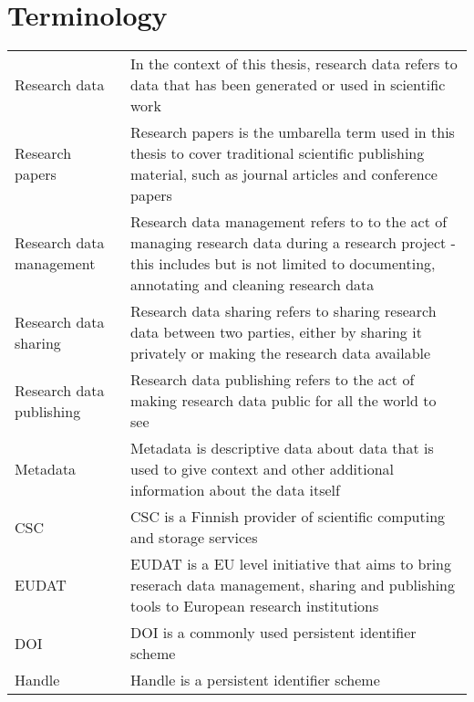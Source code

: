 \chapter*{Terminology}
{}



\noindent
\begin{longtable}{@{}p{}p{}@{}}
Research data & In the context of this thesis, research data refers to data that
has been generated or used in scientific work\\
Research papers & Research papers is the umbarella term used in this thesis to cover
traditional scientific publishing material, such as journal articles and conference papers\\
Research data management & Research data management refers to to the act of managing research
data during a research project - this includes but is not limited to documenting, annotating and
cleaning research data \\
Research data sharing & Research data sharing refers to sharing research data between two parties,
either by sharing it privately or making the research data available \\
Research data publishing & Research data publishing refers to the act of making research data
public for all the world to see \\
Metadata & Metadata is descriptive data about data that is used to give context and other
additional information about the data itself\\ 
CSC  & CSC is a Finnish provider of scientific computing and storage services\\ 
EUDAT& EUDAT is a EU level initiative that aims to bring reserach data management, sharing and
publishing tools to European research institutions\\ 
DOI & DOI is a commonly used persistent identifier scheme \\
Handle & Handle is a persistent identifier scheme

\end{longtable}
